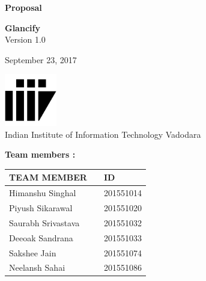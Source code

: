 \documentclass[12pt]{article}
\renewcommand{\today}{September 23, 2017}
\begin{document}
\begin{titlepage}
		\begin{center}
			
			
			\LARGE{\textbf{Proposal}}
			
			\vspace{1.5cm}
			
			\textbf{Glancify}\\
			
			\small{Version 1.0}
			\vspace{2cm}
		 
        	
			
			\vspace{1.5cm}
			
			\today
			
			\vspace{5cm}
			\includegraphics[width=0.17\textwidth]{iiitv.png} \\
			\Large{Indian Institute of Information Technology Vadodara} \\
			
		\end{center}
	\end{titlepage}
\newpage
\textbf{Team members :} \\
\begin{center}
	\begin{tabular}{ |m{10em} m{8em} m{9em}|}
		\hline
		TEAM MEMBER        &   & ID        \\
		\hline
		Himanshu Singhal             &   & 201551014 \\
		Piyush Sikarawal          &   & 201551020 \\
		Saurabh Srivastava              &   & 201551032 \\
	    Deeoak Sandrana     &   & 201551033 \\
		Sakshee Jain    &   & 201551074 \\
		Neelansh Sahai    &   & 201551086 \\ 
		\hline
	\end{tabular}
	
\end{center}

\newpage
\end{document}

